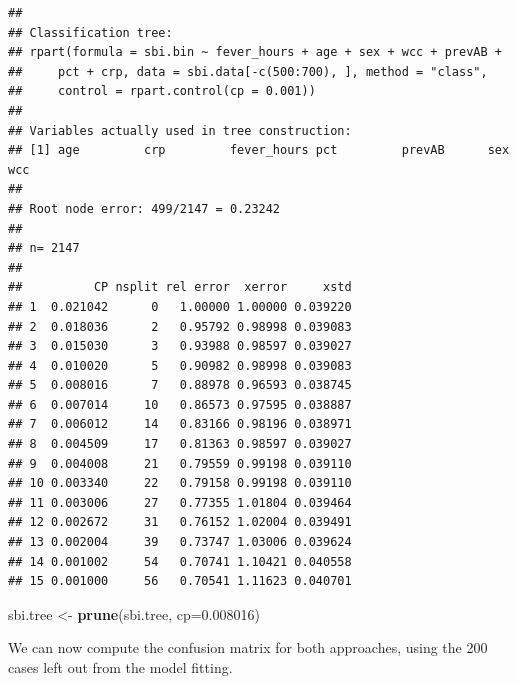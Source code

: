 \documentclass[
]{book}
\newenvironment{Shaded}{\begin{snugshade}}{\end{snugshade}}
\newcommand{\AttributeTok}[1]{\textcolor[rgb]{0.13,0.29,0.53}{#1}}
\newcommand{\CommentTok}[1]{\textcolor[rgb]{0.56,0.35,0.01}{\textit{#1}}}
\newcommand{\DecValTok}[1]{\textcolor[rgb]{0.00,0.00,0.81}{#1}}
\newcommand{\FloatTok}[1]{\textcolor[rgb]{0.00,0.00,0.81}{#1}}
\newcommand{\FunctionTok}[1]{\textcolor[rgb]{0.13,0.29,0.53}{\textbf{#1}}}
\newcommand{\NormalTok}[1]{#1}
\newcommand{\OtherTok}[1]{\textcolor[rgb]{0.56,0.35,0.01}{#1}}
\newcommand{\SpecialCharTok}[1]{\textcolor[rgb]{0.81,0.36,0.00}{\textbf{#1}}}
\newcommand{\StringTok}[1]{\textcolor[rgb]{0.31,0.60,0.02}{#1}}
\begin{document}
\begin{verbatim}
## 
## Classification tree:
## rpart(formula = sbi.bin ~ fever_hours + age + sex + wcc + prevAB + 
##     pct + crp, data = sbi.data[-c(500:700), ], method = "class", 
##     control = rpart.control(cp = 0.001))
## 
## Variables actually used in tree construction:
## [1] age         crp         fever_hours pct         prevAB      sex         wcc        
## 
## Root node error: 499/2147 = 0.23242
## 
## n= 2147 
## 
##          CP nsplit rel error  xerror     xstd
## 1  0.021042      0   1.00000 1.00000 0.039220
## 2  0.018036      2   0.95792 0.98998 0.039083
## 3  0.015030      3   0.93988 0.98597 0.039027
## 4  0.010020      5   0.90982 0.98998 0.039083
## 5  0.008016      7   0.88978 0.96593 0.038745
## 6  0.007014     10   0.86573 0.97595 0.038887
## 7  0.006012     14   0.83166 0.98196 0.038971
## 8  0.004509     17   0.81363 0.98597 0.039027
## 9  0.004008     21   0.79559 0.99198 0.039110
## 10 0.003340     22   0.79158 0.99198 0.039110
## 11 0.003006     27   0.77355 1.01804 0.039464
## 12 0.002672     31   0.76152 1.02004 0.039491
## 13 0.002004     39   0.73747 1.03006 0.039624
## 14 0.001002     54   0.70741 1.10421 0.040558
## 15 0.001000     56   0.70541 1.11623 0.040701
\end{verbatim}

\begin{Shaded}
\begin{Highlighting}[]
\NormalTok{sbi.tree }\OtherTok{\textless{}{-}} \FunctionTok{prune}\NormalTok{(sbi.tree, }\AttributeTok{cp=}\FloatTok{0.008016}\NormalTok{)}
\end{Highlighting}
\end{Shaded}

We can now compute the confusion matrix for both approaches, using the
200 cases left out from the model fitting.

\begin{Shaded}
\end{Shaded}
\end{document}
